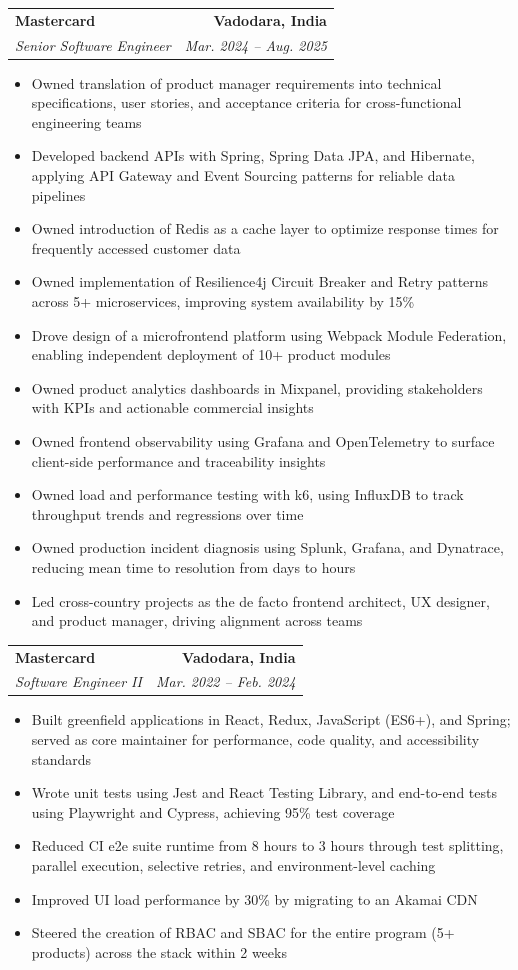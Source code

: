 \documentclass[letterpaper,11pt]{article}
\makeatletter
\newcommand{\resumeItem}[1]{
  \item\small{
    {#1 \vspace{-3pt}}
  }
}
\newcommand{\resumeSubheading}[4]{
  \vspace{-3pt}\item
    \begin{tabular*}{1.0\textwidth}[t]{l@{\extracolsep{\fill}}r}
      \textbf{#1} & \textbf{\small #2} \\
      \textit{\small#3} & \textit{\small #4} \\
    \end{tabular*}\vspace{-7pt}
}
\newcommand{\resumeItemListStart}{\begin{itemize}}
\newcommand{\resumeItemListEnd}{\end{itemize}\vspace{0pt}}
\makeatother
\begin{document}
    \resumeSubheading
      {Mastercard}{Vadodara, India}
      {Senior Software Engineer}{Mar. 2024 -- Aug. 2025}
      \resumeItemListStart
        \resumeItem{Owned translation of product manager requirements into technical specifications, user stories, and acceptance criteria for cross-functional engineering teams}
        \resumeItem{Developed backend APIs with Spring, Spring Data JPA, and Hibernate, applying API Gateway and Event Sourcing patterns for reliable data pipelines}
        \resumeItem{Owned introduction of Redis as a cache layer to optimize response times for frequently accessed customer data}
        \resumeItem{Owned implementation of Resilience4j Circuit Breaker and Retry patterns across 5+ microservices, improving system availability by 15\%}
        \resumeItem{Drove design of a microfrontend platform using Webpack Module Federation, enabling independent deployment of 10+ product modules}
        \resumeItem{Owned product analytics dashboards in Mixpanel, providing stakeholders with KPIs and actionable commercial insights}
        \resumeItem{Owned frontend observability using Grafana and OpenTelemetry to surface client-side performance and traceability insights}
        \resumeItem{Owned load and performance testing with k6, using InfluxDB to track throughput trends and regressions over time}
        \resumeItem{Owned production incident diagnosis using Splunk, Grafana, and Dynatrace, reducing mean time to resolution from days to hours}
        \resumeItem{Led cross-country projects as the de facto frontend architect, UX designer, and product manager, driving alignment across teams}
      \resumeItemListEnd

    \resumeSubheading
      {Mastercard}{Vadodara, India}
      {Software Engineer II}{Mar. 2022 -- Feb. 2024}
      \resumeItemListStart
        \resumeItem{Built greenfield applications in React, Redux, JavaScript (ES6+), and Spring; served as core maintainer for performance, code quality, and accessibility standards}
        \resumeItem{Wrote unit tests using Jest and React Testing Library, and end-to-end tests using Playwright and Cypress, achieving 95\% test coverage}
        \resumeItem{Reduced CI e2e suite runtime from 8 hours to 3 hours through test splitting, parallel execution, selective retries, and environment-level caching}
        \resumeItem{Improved UI load performance by 30\% by migrating to an Akamai CDN}
        \resumeItem{Steered the creation of RBAC and SBAC for the entire program (5+ products) across the stack within 2 weeks}
      \resumeItemListEnd
\end{document}
